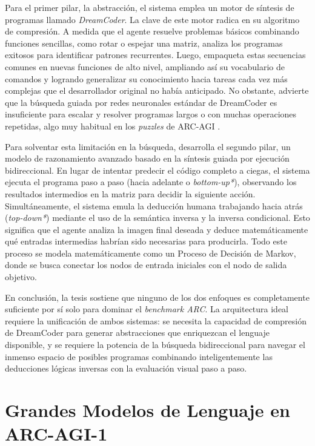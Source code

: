 \documentclass[11pt,a4paper,spanish]{book}
\numberwithin{equation}{chapter}
\numberwithin{figure}{chapter}
\begin{document}
Para el primer pilar, la abstracción, el sistema emplea un motor de síntesis de programas llamado \textit{DreamCoder}. La clave de este motor radica en su algoritmo de
compresión. A medida que el agente resuelve problemas básicos combinando funciones sencillas, como rotar o espejar una  matriz, analiza los programas exitosos 
para identificar patrones recurrentes. Luego, empaqueta estas secuencias comunes en nuevas funciones de alto nivel, ampliando así su vocabulario de comandos y logrando 
generalizar su conocimiento hacia tareas cada vez más complejas que el desarrollador original no había anticipado. No obstante,  advierte que la búsqueda guiada 
por redes neuronales estándar de DreamCoder es insuficiente para escalar y resolver programas largos o con muchas operaciones repetidas, algo muy habitual en los \textit{puzzles} 
de ARC-AGI \cite{alford2021neurosymbolic}.

Para solventar esta limitación en la búsqueda,  desarrolla el segundo pilar, un modelo de razonamiento avanzado basado en la síntesis guiada por ejecución 
bidireccional. En lugar de intentar predecir el código completo a ciegas, el sistema ejecuta el programa paso a paso (hacia adelante o \textit{bottom-up*}), observando los 
resultados intermedios en la matriz para decidir la siguiente acción. Simultáneamente, el sistema emula la deducción humana trabajando hacia atrás (\textit{top-down*}) 
mediante el uso de la semántica inversa y la inversa condicional. Esto significa que el agente analiza la imagen final deseada y deduce matemáticamente qué 
entradas intermedias habrían sido necesarias para producirla. Todo este proceso se modela matemáticamente como un Proceso de Decisión de Markov, donde se busca 
conectar los nodos de entrada iniciales con el nodo de salida objetivo.

En conclusión, la tesis sostiene que ninguno de los dos enfoques es completamente suficiente por sí solo para dominar el \textit{benchmark ARC}. 
La arquitectura ideal requiere la unificación de ambos sistemas: se necesita la capacidad de compresión de DreamCoder para generar abstracciones que enriquezcan el lenguaje disponible, 
y se requiere la potencia de la búsqueda bidireccional para navegar el inmenso espacio de posibles programas combinando inteligentemente las deducciones lógicas inversas con la evaluación visual 
paso a paso.

\section{Grandes Modelos de Lenguaje en ARC-AGI-1}
\end{document}
